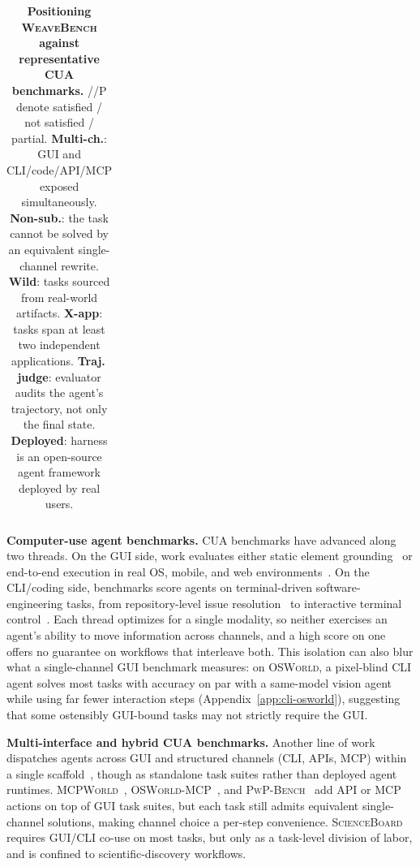 \documentclass{llmxive}
\providecommand{\Eyeson}{\textsc{WeaveBench}\xspace}
\providecommand{\osworld}{\textsc{OSWorld}\xspace}
\providecommand{\cmark}{\ding{51}}
\providecommand{\xmark}{\ding{55}}
\providecommand{\section}[1]{  \oldappendixsection{#1}  \setcounter{table}{0}  \setcounter{figure}{0}}
\begin{document}
\begin{table}[t]
\begin{tabular}{lccccccc}
\bottomrule
\end{tabular}
\caption{\textbf{Positioning \Eyeson{} against representative CUA benchmarks.} \cmark/\xmark/P denote satisfied / not satisfied / partial.
\textbf{Multi-ch.}: GUI and CLI/code/API/MCP exposed simultaneously.
\textbf{Non-sub.}: the task cannot be solved by an equivalent single-channel rewrite.
\textbf{Wild}: tasks sourced from real-world artifacts.
\textbf{X-app}: tasks span at least two independent applications. \textbf{Traj.\,judge}: evaluator audits the agent's trajectory, not only the final state. \textbf{Deployed}: harness is an open-source agent framework deployed by real users.}
\label{tab:positioning}
\end{table}

\section{Related Work}
\label{sec:related}

\noindent\textbf{Computer-use agent benchmarks.}
CUA benchmarks have advanced along two threads. On the GUI side, work evaluates either static element grounding~\citep{li2025screenspotpro,cheng2024seeclick,wu2024osatlas,you2024ferretui,lin2024showui,xu2024aguvis} or end-to-end execution in real OS, mobile, and web environments~\citep{xie2024osworld,bonatti2024waa,rawles2025androidworld,zhou2024webarena,koh2024visualwebarena}. On the CLI/coding side, benchmarks score agents on terminal-driven software-engineering tasks, from repository-level issue resolution~\citep{jimenez2024swebench,openai2024swebenchverified} to interactive terminal control~\citep{terminalbench2025,chu2026terminalworld}. Each thread optimizes for a single modality, so neither exercises an agent's ability to move information across channels, and a high score on one offers no guarantee on workflows that interleave both. This isolation can also blur what a single-channel GUI benchmark measures: on \osworld{}, a pixel-blind CLI agent solves most tasks with accuracy on par with a same-model vision agent while using far fewer interaction steps (Appendix~\ref{app:cli-osworld}), suggesting that some ostensibly GUI-bound tasks may not strictly require the GUI.

\medskip
\noindent\textbf{Multi-interface and hybrid CUA benchmarks.}
Another line of work dispatches agents across GUI and structured channels (CLI, APIs, MCP) within a single scaffold~\citep{song2025coact1,microsoft2025ufo2}, though as standalone task suites rather than deployed agent runtimes. \textsc{MCPWorld}~\citep{yan2025mcpworld}, \textsc{OSWorld-MCP}~\citep{jia2025osworldmcp}, and \textsc{PwP-Bench}~\citep{aggarwal2025pwp} add API or MCP actions on top of GUI task suites, but each task still admits equivalent single-channel solutions, making channel choice a per-step convenience. \textsc{ScienceBoard}~\citep{sun2026scienceboard} requires GUI/CLI co-use on most tasks, but only as a task-level division of labor, and is confined to scientific-discovery workflows.
\end{document}
